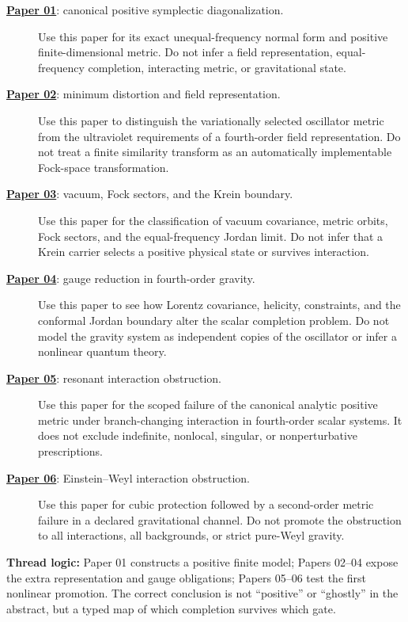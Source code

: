 \documentclass[11pt]{article}
\newcommand{\paperlink}[2]{\href{#1}{\textbf{Paper #2}}}
\begin{document}
\begin{description}
\item[\paperlink{01-symplectic-diagonalization.pdf}{01}: canonical positive
symplectic diagonalization.]
Use this paper for its exact unequal-frequency normal form and positive
finite-dimensional metric.  Do not infer a field representation,
equal-frequency completion, interacting metric, or gravitational state.

\item[\paperlink{02-variational-fock.pdf}{02}: minimum distortion and field
representation.]
Use this paper to distinguish the variationally selected oscillator metric
from the ultraviolet requirements of a fourth-order field representation.
Do not treat a finite similarity transform as an automatically implementable
Fock-space transformation.

\item[\paperlink{03-fourth-order-vacuum.pdf}{03}: vacuum, Fock sectors, and
the Krein boundary.]
Use this paper for the classification of vacuum covariance, metric orbits,
Fock sectors, and the equal-frequency Jordan limit.  Do not infer that a
Krein carrier selects a positive physical state or survives interaction.

\item[\paperlink{04-fourth-order-gravity.pdf}{04}: gauge reduction in
fourth-order gravity.]
Use this paper to see how Lorentz covariance, helicity, constraints, and the
conformal Jordan boundary alter the scalar completion problem.  Do not model
the gravity system as independent copies of the oscillator or infer a
nonlinear quantum theory.

\item[\paperlink{05-interaction-obstructions.pdf}{05}: resonant interaction
obstruction.]
Use this paper for the scoped failure of the canonical analytic positive
metric under branch-changing interaction in fourth-order scalar systems.  It
does not exclude indefinite, nonlocal, singular, or nonperturbative
prescriptions.

\item[\paperlink{06-einstein-weyl-interaction-obstructions.pdf}{06}:
Einstein--Weyl interaction obstruction.]
Use this paper for cubic protection followed by a second-order metric failure
in a declared gravitational channel.  Do not promote the obstruction to all
interactions, all backgrounds, or strict pure-Weyl gravity.
\end{description}

\textbf{Thread logic:}
Paper 01 constructs a positive finite model; Papers 02--04 expose the extra
representation and gauge obligations; Papers 05--06 test the first nonlinear
promotion.  The correct conclusion is not ``positive'' or ``ghostly'' in the
abstract, but a typed map of which completion survives which gate.
\end{document}
